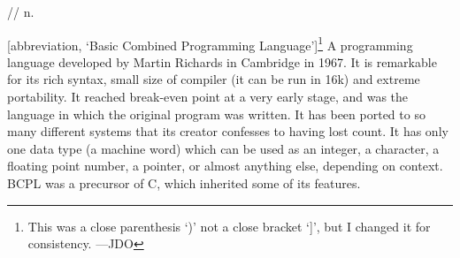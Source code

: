  // n.

[abbreviation, `Basic Combined Programming Language']\footnote{This was a close
parenthesis `)' not a close bracket `]', but I changed it for consistency.
---JDO} A programming language developed by Martin Richards in Cambridge in
1967. It is remarkable for its rich syntax, small size of compiler (it can be
run in 16k) and extreme portability. It reached break-even point at a very early
stage, and was the language in which the original 
program was written. It has been ported to so many different systems that its
creator confesses to having lost count. It has only one data type (a machine
word) which can be used as an integer, a character, a floating point number, a
pointer, or almost anything else, depending on context. BCPL was a precursor of
C, which inherited some of its features.

